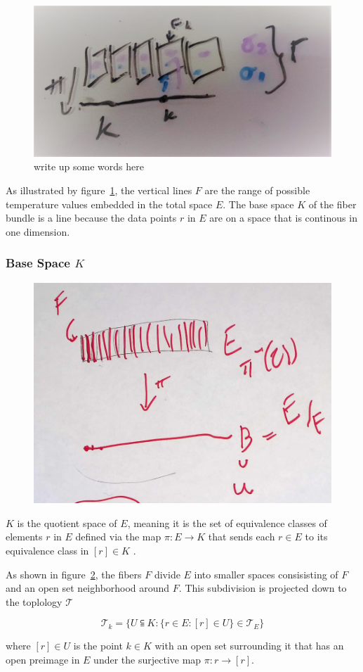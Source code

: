 \documentclass[../main.tex]{subfiles}
\begin{document}
\begin{figure}[ht]
    \includegraphics[width=.2\linewidth]{figures/sections/math/fiberbundle.png}
    \caption{write up some words here}
    \label{fig:fiberbundle}
\end{figure}

As illustrated by figure~\ref{fig:fiberbundle}, the vertical lines $F$ are the range of possible temperature values embedded in the total space $E$. The base space $K$ of the fiber bundle is a line because the data points $r$ in $E$ are on a space that is  continous in one dimension. 

\subsubsection{Base Space $K$}

\begin{figure}[ht]
    \includegraphics[width=0.4\linewidth]{figures/sections/math/k_qspace.png}
    \label{fig:kquote}
\end{figure}

$K$ is the quotient space of $E$, meaning it is the set of equivalence classes of elements $r$ in $E$ defined via the map $\pi: E \rightarrow K$ that sends each $r \in E$ to its equivalence class in $[r] \in K$ \cite{QuotientSpaceTopology2020,QuotientSpaceTopology2020}.

As shown in figure~\ref{fig:kquote}, the fibers $F$ divide $E$ into smaller spaces consisisting of $F$ and an open set neighborhood around $F$. This subdivision is projected down to the toplology $\mathcal{T}$

\begin{equation}
\mathcal{T}_k = \{U\subseteqq K: \{r \in E: [r] \in U\}\in \mathcal{T}_E\}
\end{equation}

where $[r] \in U$ is the point $k \in K$ with an open set surrounding it that has an open preimage in $E$ under the surjective map $\pi: r \rightarrow [r]$. 
\end{document}
